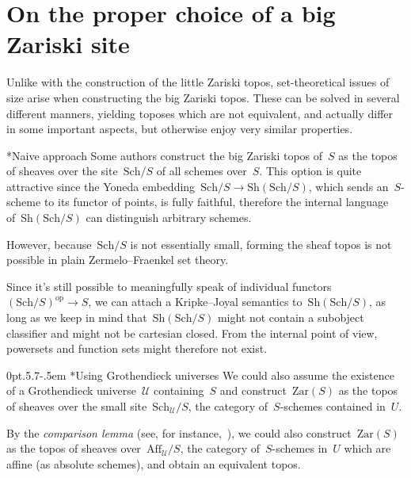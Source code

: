 \documentclass[10pt,reqno,a4paper]{amsbook}
\makeatletter
\theoremstyle{definition}
\theoremstyle{plain}
\theoremstyle{remark}
\renewcommand{\U}{\mathcal{U}}
\newcommand{\Sh}{\mathrm{Sh}}
\newcommand{\Zar}{\mathrm{Zar}}
\newcommand{\Sch}{\mathrm{Sch}}
\newcommand{\Aff}{\mathrm{Aff}}
\newcommand{\op}{\mathrm{op}}
\newcommand{\?}{\,{:}\,}
\renewcommand{\_}{\mathpunct{.}\,}
\newcommand{\nocontentsline}[3]{}
\newcommand{\tocless}[1]{\let\addcontentsline=\nocontentsline}
\def\subsection{\@startsection{subsection}{2}%
  {0pt}{.5\linespacing\@plus.7\linespacing}{-.5em}%
  {\normalfont\bfseries}}
\makeatother
\begin{document}
\section{On the proper choice of a big Zariski site}
\label{sect:proper-choice-of-site}

Unlike with the construction of the little Zariski topos, set-theoretical
issues of size arise when constructing the big Zariski topos. These can be
solved in several different manners, yielding toposes which are not equivalent,
and actually differ in some important aspects, but otherwise enjoy very similar
properties.

{\tocless

\subsection*{Naive approach}
Some authors construct the big Zariski topos of~$S$ as the topos of
sheaves over the site~$\Sch/S$ of all schemes over~$S$. This option is quite
attractive since the Yoneda embedding~$\Sch/S \to \Sh(\Sch/S)$, which sends
an~$S$-scheme to its functor of points, is fully faithful, therefore the
internal language of~$\Sh(\Sch/S)$ can distinguish arbitrary schemes.

However, because~$\Sch/S$ is not essentially small, forming the sheaf topos is
not possible in plain Zermelo--Fraenkel set theory.

Since it's still possible to meaningfully speak of individual
functors~$(\Sch/S)^\op \to S$, we can attach a Kripke--Joyal semantics
to~$\Sh(\Sch/S)$, as long as we keep in mind that~$\Sh(\Sch/S)$ might
not contain a subobject classifier and might not be cartesian closed. From the
internal point of view, powersets and function sets might therefore not exist.

\subsection*{Using Grothendieck universes}
We could also assume the existence of a Gro\-then\-dieck universe~$\U$
containing~$S$ and construct~$\Zar(S)$ as the topos of sheaves over the
small site~$\Sch_\U/S$, the category of~$S$-schemes contained in~$U$.

By the \emph{comparison lemma} (see, for instance,~\cite[Theorem~3.7]{caramello:preliminaries}), we could also construct~$\Zar(S)$ as
the topos of sheaves over~$\Aff_\U/S$, the category of~$S$-schemes in~$U$ which
are affine (as absolute schemes), and obtain an equivalent topos.

}
\end{document}
